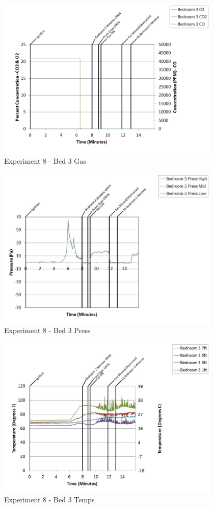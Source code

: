 \documentclass{article}
\begin{document}
\begin{appendices}
	\clearpage

	\begin{figure}[h!]
		\centering
		\includegraphics[height=3.05in]{0_Images/Results_Charts/Exp_8_Charts/Bed3Gas.pdf}
		\caption{Experiment 8 - Bed 3 Gas}
	\end{figure}
 

	\begin{figure}[h!]
		\centering
		\includegraphics[height=3.05in]{0_Images/Results_Charts/Exp_8_Charts/Bed3Press.pdf}
		\caption{Experiment 8 - Bed 3 Press}
	\end{figure}
 
	\clearpage

	\begin{figure}[h!]
		\centering
		\includegraphics[height=3.05in]{0_Images/Results_Charts/Exp_8_Charts/Bed3Temps.pdf}
		\caption{Experiment 8 - Bed 3 Temps}
	\end{figure}
 


\end{appendices}
\end{document}
